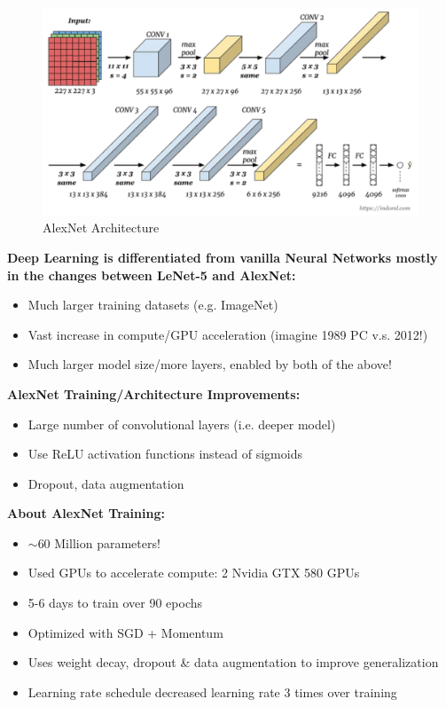 \begin{figure}[h!t]
    \centering
    \includegraphics[width=0.75\linewidth]{alexnet.png}
    \caption{AlexNet Architecture}
    \label{fig:enter-label}
\end{figure}

\noindent \textbf{Deep Learning is differentiated from vanilla Neural Networks mostly in the changes between LeNet-5 and AlexNet:}
\begin{itemize}
  \item Much larger training datasets (e.g. ImageNet)
  \item Vast increase in compute/GPU acceleration (imagine 1989 PC v.s. 2012!)
  \item Much larger model size/more layers, enabled by both of the above!
\end{itemize}
\textbf{AlexNet Training/Architecture Improvements:}
\begin{itemize}
  \item Large number of convolutional layers (i.e. deeper model)
  \item Use ReLU activation functions instead of sigmoids
  \item Dropout, data augmentation
\end{itemize}
\textbf{About AlexNet Training:}
\begin{itemize}
  \item $\sim$60 Million parameters!
  \item Used GPUs to accelerate compute: 2 Nvidia GTX 580 GPUs
  \item 5-6 days to train over 90 epochs
  \item Optimized with SGD + Momentum
  \item Uses weight decay, dropout \& data augmentation to improve generalization
  \item Learning rate schedule decreased learning rate 3 times over training
\end{itemize}

